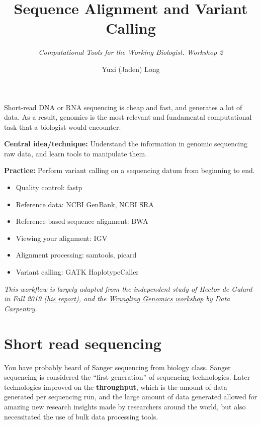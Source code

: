 \documentclass[12pt,letterpaper]{article}
\title{\textbf{Sequence Alignment and Variant Calling}}
\author{\textit{Computational Tools for the Working Biologist. Workshop 2}}
\date{Yuxi (Jaden) Long}
\begin{document}
\maketitle
\thispagestyle{empty}

\vspace{1em}

\noindent
Short-read DNA or RNA sequencing is cheap and fast, and generates a lot of data. As a result, genomics is the most relevant and fundamental computational task that a biologist would encounter.

\noindent
\textbf{Central idea/technique:} Understand the information in genomic sequencing raw data, and learn tools to manipulate them.

\textbf{Practice:} Perform variant calling on a sequencing datum from beginning to end.

\begin{itemize}
   \item Quality control: fastp
   \item Reference data: NCBI GenBank, NCBI SRA
   \item Reference based sequence alignment: BWA
   \item Viewing your alignment: IGV
   \item Alignment processing: samtools, picard
   \item Variant calling: GATK HaplotypeCaller
\end{itemize}

\textit{This workflow is largely adapted from the independent study of Hector de Galard in Fall 2019 (\href{https://github.com/longyuxi/biobyte-bioinformatics-workshop/blob/main/2/supplement/Hector_19L22.docx}{his report}), and the \href{https://www.hadriengourle.com/wrangling-genomics/01-variant_calling_workflow/}{Wrangling Genomics workshop} by Data Carpentry.}

\section{Short read sequencing}

You have probably heard of Sanger sequencing from biology class. Sanger sequencing is considered the ``first generation'' of sequencing technologies. Later technologies improved on the \textbf{throughput}, which is the amount of data generated per sequencing run, and the large amount of data generated allowed for amazing new research insights made by researchers around the world, but also necessitated the use of bulk data processing tools.
\end{document}
